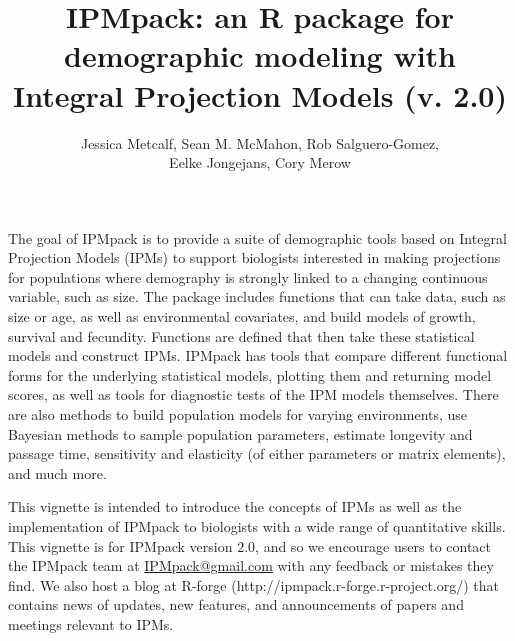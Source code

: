 \documentclass{article}
\begin{document}


\title{IPMpack: an R package for demographic modeling with Integral Projection
Models (v. 2.0)}
\author{Jessica Metcalf, Sean M. McMahon, Rob Salguero-Gomez,\\ Eelke Jongejans, Cory Merow}
\maketitle


The goal of IPMpack is to provide a suite of demographic tools based
on Integral Projection Models (IPMs) to support biologists interested in
making projections for populations where demography is strongly linked to a changing continuous variable, such as size. The package includes functions that can take data, such as size or age, as well as environmental covariates, and build models of growth, survival and fecundity. Functions are defined that then take these
statistical models and construct IPMs. IPMpack has tools that compare different
functional forms for the underlying statistical models, plotting them and
returning model scores, as well as tools for diagnostic tests of the IPM models
themselves. There are also methods to build population models for varying environments, use Bayesian methods to sample population parameters,  estimate longevity and passage time, sensitivity and elasticity (of either parameters or matrix elements), and much more.

This vignette is intended to introduce the concepts of IPMs as well as the
implementation of IPMpack to biologists with a wide range of quantitative skills.  This vignette is for IPMpack version $2.0$, and so we encourage users to contact the IPMpack team at \href{IPMpack@gmail.com}{IPMpack@gmail.com} with any feedback or mistakes they find.  We also host a blog at R-forge (http://ipmpack.r-forge.r-project.org/) that contains news of updates, new features, and announcements of papers and meetings relevant to IPMs.
 
\newpage
\end{document}
